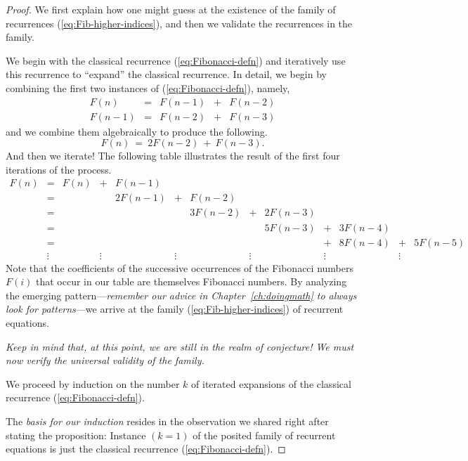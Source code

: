 \begin{proof}
We first explain how one might guess at the existence of the family of
recurrences (\ref{eq:Fib-higher-indices}), and then we validate the
recurrences in the family.

We begin with the classical recurrence (\ref{eq:Fibonacci-defn})
and iteratively use this recurrence to ``expand'' the classical
recurrence.  In detail, we begin by combining the first two instances
of (\ref{eq:Fibonacci-defn}), namely,
\[
\begin{array}{lcrrr}
F(n)   & = & F(n-1) & + & F(n-2) \\
F(n-1) & = & F(n-2) & + & F(n-3)
\end{array}
\]
and we combine them algebraically to produce the following.
\[ F(n) \ = \ 2 F(n-2) \ + \ F(n-3). \]
And then we iterate!  The following table illustrates the result of
the first four iterations of the process.
\[
\begin{array}{ccrcrcrcrcrcr}
F(n) & = & F(n) & + & F(n-1) \\
     & = &      &   & 2 F(n-1) & + & F(n-2) \\
     & = &      &   &          &   & 3 F(n-2) & + & 2 F(n-3) \\
     & = &      &   &          &   &          &   & 5 F(n-3) & + & 3 F(n-4)  \\
     & = &      &   &          &   &          &   &          & + & 8
F(n-4) & + & 5 F(n-5)  \\
 & \vdots  &  & \vdots  &  &  \vdots &  & \vdots
 &  & \vdots  &   & \vdots  & 
\end{array}
\]
Note that the coefficients of the successive occurrences of the
Fibonacci numbers $F(i)$ that occur in our table are themselves
Fibonacci numbers.  By analyzing the emerging pattern---{\em remember
  our advice in Chapter~\ref{ch:doingmath} to always look for
  patterns}---we arrive at the family (\ref{eq:Fib-higher-indices})
of recurrent equations.

{\em Keep in mind that, at this point, we are still in the realm of
  conjecture!  We must now verify the universal validity of the
  family.}

We proceed by induction on the number $k$ of iterated expansions of
the classical recurrence (\ref{eq:Fibonacci-defn}).

The {\em basis for our induction} resides in the observation we shared
right after stating the proposition: Instance $(k = 1)$ of the posited
family of recurrent equations is just the classical recurrence
(\ref{eq:Fibonacci-defn}).


\end{proof}
